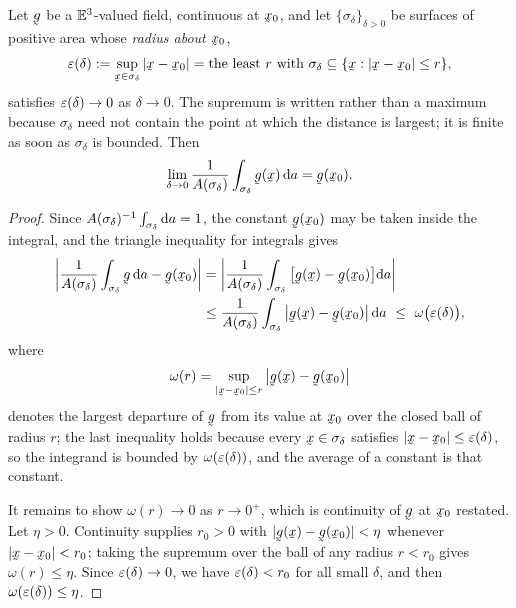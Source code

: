 \begin{lemma}\label{lem:ch6avg}
Let $\bg$ be a $\mathbb{E}^{3}$-valued field, continuous at $\bx_{0}$, and let
$\{\sigma_{\delta}\}_{\delta>0}$ be surfaces of positive area whose
\emph{radius about $\bx_{0}$},
\[
   \eps(\delta):=\sup_{\bx\in\sigma_{\delta}}|\bx-\bx_{0}|
   =\text{the least }r\text{ with }
   \sigma_{\delta}\subseteq\{\bx:|\bx-\bx_{0}|\le r\} ,
\]
satisfies $\varepsilon(\delta)\to0$ as $\delta\to0$. The supremum is written
rather than a maximum because $\sigma_{\delta}$ need not contain the
point at which the distance is largest; it is finite as soon as
$\sigma_{\delta}$ is bounded. Then
\[
   \lim_{\delta\to0}\frac{1}{A(\sigma_{\delta})}
   \int_{\sigma_{\delta}}\bg(\bx)\,\dl a=\bg(\bx_{0}).
\]
\end{lemma}

\begin{proof}
Since $A(\sigma_{\delta})^{-1}\int_{\sigma_{\delta}}\mathrm{d} a=1$, the
constant $\bg(\bx_{0})$ may be taken inside the integral, and the
triangle inequality for integrals gives
\[
\begin{aligned}
   \left|\frac{1}{A(\sigma_{\delta})}\int_{\sigma_{\delta}}\bg\,\dl a
   -\bg(\bx_{0})\right|
   &=\left|\frac{1}{A(\sigma_{\delta})}\int_{\sigma_{\delta}}
     \big[\bg(\bx)-\bg(\bx_{0})\big]\dl a\right|\\
   &\leq\frac{1}{A(\sigma_{\delta})}\int_{\sigma_{\delta}}
     \big|\bg(\bx)-\bg(\bx_{0})\big|\,\dl a
   \ \leq\ \omega\big(\eps(\delta)\big),
\end{aligned}
\]
where
\[
   \omega(r)=\sup_{|\bx-\bx_{0}|\leq r}\big|\bg(\bx)-\bg(\bx_{0})\big|
\]
denotes the largest departure of $\bg$ from its value at $\bx_{0}$ over
the closed ball of radius $r$; the last inequality holds because every
$\bx\in\sigma_{\delta}$ satisfies $|\bx-\bx_{0}|\le\eps(\delta)$, so the
integrand is bounded by $\omega(\varepsilon(\delta))$, and the average of a
constant is that constant.

It remains to show $\omega(r)\to0$ as $r\to0^{+}$, which is continuity
of $\bg$ at $\bx_{0}$ restated. Let $\eta>0$. Continuity supplies
$r_{0}>0$ with $|\bg(\bx)-\bg(\bx_{0})|<\eta$ whenever
$|\bx-\bx_{0}|<r_{0}$; taking the supremum over the ball of any radius
$r<r_{0}$ gives $\omega(r)\le\eta$. Since $\varepsilon(\delta)\to0$, we have
$\varepsilon(\delta)<r_{0}$ for all small $\delta$, and then
$\omega(\varepsilon(\delta))\le\eta$.
\end{proof}

